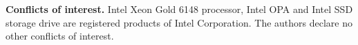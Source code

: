\documentclass[runningheads]{llncs}
\begin{document}
	\linebreak
  \noindent
	\textbf{Conflicts of interest.} Intel\textregistered{} Xeon\textregistered{} Gold 6148 processor, Intel\textregistered{} OPA and Intel\textregistered{} SSD storage drive are registered products of Intel Corporation. The authors declare no other conflicts of interest.
		
	
	
\end{document}
